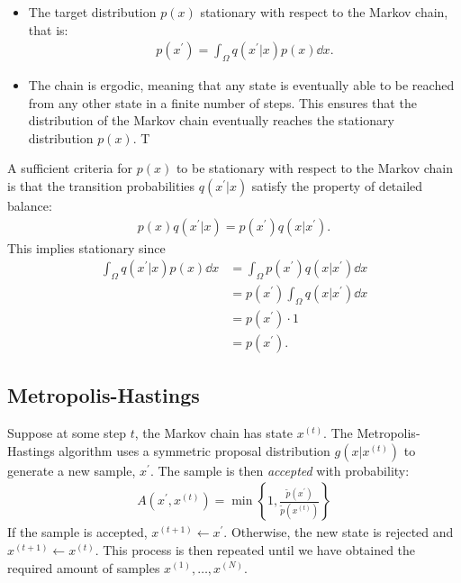 \begin{itemize}
    \item The target distribution $p(x)$ stationary with respect to the Markov chain, that is:
    \begin{align} \label{eq:stationarity}
        p(x^\prime) = \int_{\Omega} q(x^\prime| x) p(x) \dd{x}.
    \end{align}
    
    \item The chain is ergodic, meaning that any state is eventually able to be reached from any other state in a finite number of steps.
    This ensures that the distribution of the Markov chain eventually reaches the stationary distribution $p(x)$.
    T
    
\end{itemize}
A sufficient criteria for $p(x)$ to be stationary with respect to the Markov chain is that the transition probabilities $q(x^\prime|x)$ satisfy the property of detailed balance:
\begin{align*}
    p(x)q(x^\prime | x) = p(x^\prime)q(x| x^\prime).
\end{align*}
This implies stationary since
\begin{equation}
    \begin{aligned}    
        \int_{\Omega} q(x^\prime | x) p(x) \dd{x} 
        &= \int_{\Omega}  p(x^\prime)q(x| x^\prime) \dd{x} \\ 
        &=  p(x^\prime) \int_{\Omega} q(x| x^\prime) \dd{x} \\
        &=  p(x^\prime) \cdot 1 \\
        &= p(x^\prime).
    \end{aligned}
\end{equation}
\subsection{Metropolis-Hastings}

Suppose at some step $t$, the Markov chain has state $x^{(t)}$.
The Metropolis-Hastings algorithm uses a symmetric proposal distribution $g(x|x^{(t)})$ to generate a new sample, $x^\prime$.
The sample is then \emph{accepted} with probability:
\begin{align}
    A(x^{\prime}, x^{(t)}) = \min\left\{1, \frac{\tilde{p}(x^\prime)}{\tilde{p}(x^{(t)})}\right\}
\end{align}
If the sample is accepted, $x^{(t+1)} \gets x^\prime$.
Otherwise, the new state is rejected and $x^{(t+1)} \gets x^{(t)}$.
This process is then repeated until we have obtained the required amount of samples $x^{(1)},\dots,x^{(N)}$. 



